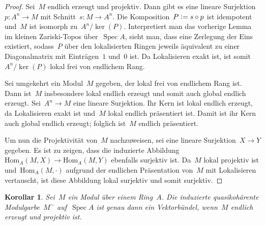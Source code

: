\documentclass[12pt]{scrartcl}
\theoremstyle{definition}
\theoremstyle{plain}
\newtheorem*{cor}{Korollar}
\theoremstyle{remark}
\newcommand{\defeq}{\vcentcolon=}
\newcommand{\Hom}{\mathrm{Hom}}
\begin{document}
\begin{proof}Sei~$M$ endlich erzeugt und projektiv. Dann gibt es eine lineare
Surjektion~$p : A^n \to M$ mit Schnitt~$s : M \to A^n$. Die Komposition~$P
\defeq s \circ p$ ist idempotent und~$M$ ist isomorph zu~$A^n/\operatorname{ker}(P)$.
Interpretiert man das vorherige Lemma im kleinen Zariski-Topos
über~$\operatorname{Spec} A$, sieht man, dass eine Zerlegung der Eins
existiert, sodass~$P$ über den lokalisierten Ringen jeweils äquivalent zu einer
Diagonalmatrix mit Einträgen~$1$ und~$0$ ist. Da Lokalisieren exakt ist, ist
somit~$A^n/\operatorname{ker}(P)$ lokal frei von endlichem Rang.

Sei umgekehrt ein Modul~$M$ gegeben, der lokal frei von endlichem Rang ist.
Dann ist~$M$ insbesondere lokal endlich erzeugt und somit auch global endlich erzeugt. Sei~$A^n \to M$ eine lineare
Surjektion. Ihr Kern ist lokal endlich erzeugt, da Lokalisieren exakt ist
und~$M$ lokal endlich präsentiert ist. Damit ist ihr Kern auch global endlich
erzeugt; folglich ist~$M$ endlich präsentiert.

Um nun die Projektivität
von~$M$ nachzuweisen, sei eine lineare Surjektion~$X \to Y$ gegeben. Es ist zu
zeigen, dass die induzierte Abbildung~$\Hom_A(M,X) \to \Hom_A(M,Y)$ ebenfalls
surjektiv ist. Da~$M$ lokal projektiv ist und~$\Hom_A(M,\cdot)$ aufgrund der
endlichen Präsentation von~$M$ mit Lokalisieren vertauscht, ist diese Abbildung
lokal surjektiv und somit surjektiv.
\end{proof}

\begin{cor}Sei~$M$ ein Modul über einem Ring~$A$. Die induzierte
quasikohärente Modulgarbe~$M^\sim$ auf~$\operatorname{Spec} A$ ist genau dann ein Vektorbündel, wenn~$M$
endlich erzeugt und projektiv ist.\end{cor}

\end{document}
